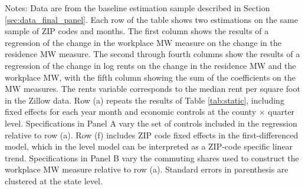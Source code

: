 \begin{landscape}
\begin{table}[ht!]
    \begin{minipage}{.95\linewidth} \footnotesize
        \vspace{2mm}
        Notes: 
        Data are from the baseline estimation sample described in Section 
        \ref{sec:data_final_panel}.
        Each row of the table shows two estimations on the same sample of ZIP 
        codes and months.
        The first column shows the results of a regression of the change in the 
        workplace MW measure on the change in the residence MW measure.
        The second through fourth columns show the results of a regression of 
        the change in log rents on the change in the residence MW and the 
        workplace MW, with the fifth column showing the sum of the coefficients 
        on the MW measures.
        The rents variable corresponds to the median rent per square foot in
        the Zillow data.
        Row (a) repeats the results of Table \ref{tab:static}, including fixed
        effects for each year month and economic controls at the 
        county $\times$ quarter level.
        Specifications in Panel A vary the set of controls included in the 
        regression relative to row (a).
        Row (f) includes ZIP code fixed effects in the first-differenced model,
        which in the level model can be interpreted as a ZIP-code specific 
        linear trend.
        Specifications in Panel B vary the commuting shares used to construct 
        the workplace MW measure relative to row (a).
        Standard errors in parenthesis are clustered at the state level.
    \end{minipage}
\end{table}
\end{landscape}
